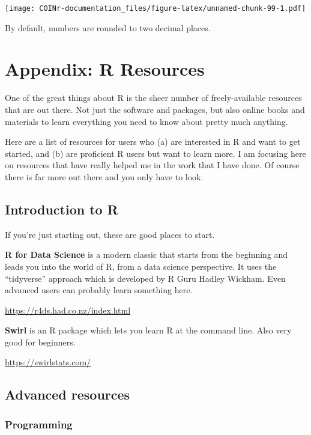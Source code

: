 \documentclass[
]{book}
\begin{document}
\texttt{[image: COINr-documentation\_files/figure-latex/unnamed-chunk-99-1.pdf]}

By default, numbers are rounded to two decimal places.

\hypertarget{appendix-r-resources}{%
\chapter{Appendix: R Resources}\label{appendix-r-resources}}

One of the great things about R is the sheer number of freely-available resources that are out there. Not just the software and packages, but also online books and materials to learn everything you need to know about pretty much anything.

Here are a list of resources for users who (a) are interested in R and want to get started, and (b) are proficient R users but want to learn more. I am focusing here on resources that have really helped me in the work that I have done. Of course there is far more out there and you only have to look.

\hypertarget{introduction-to-r}{%
\section{Introduction to R}\label{introduction-to-r}}

If you're just starting out, these are good places to start.

\textbf{R for Data Science} is a modern classic that starts from the beginning and leads you into the world of R, from a data science perspective. It uses the ``tidyverse'' approach which is developed by R Guru Hadley Wickham. Even advanced users can probably learn something here.

\url{https://r4ds.had.co.nz/index.html}

\textbf{Swirl} is an R package which lets you learn R at the command line. Also very good for beginners.

\url{https://swirlstats.com/}

\hypertarget{advanced-resources}{%
\section{Advanced resources}\label{advanced-resources}}

\hypertarget{programming}{%
\subsection{Programming}\label{programming}}
\end{document}
